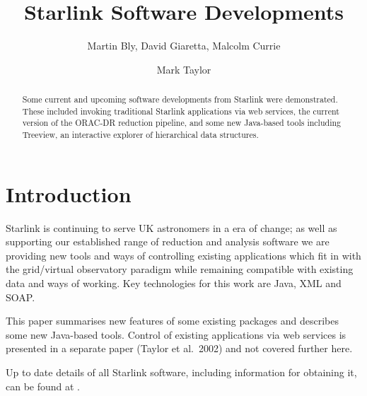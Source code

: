 



\title{Starlink Software Developments}

\author{Martin Bly, David Giaretta, Malcolm Currie}

\author{Mark Taylor}




\begin{abstract}
Some current and upcoming software developments from Starlink were demonstrated.
These included invoking traditional Starlink applications via
web services, the current version of the ORAC-DR reduction pipeline,
and some new Java-based tools including Treeview, an
interactive explorer of hierarchical data structures.
\end{abstract}

\section{Introduction}

Starlink is continuing to serve UK astronomers in a era of change;
as well as supporting our established range of reduction and analysis
software we are providing new tools and ways of controlling existing
applications which fit in with the grid/virtual observatory paradigm
while remaining compatible with existing data and ways of working.
Key technologies for this work are Java, XML and SOAP.

This paper summarises new features of some existing packages and
describes some new Java-based tools.
Control of existing applications via web services is presented
in a separate paper (Taylor et al.\ 2002) and not covered further here.

Up to date details of all Starlink software, including information for
obtaining it, can be found at 
.

